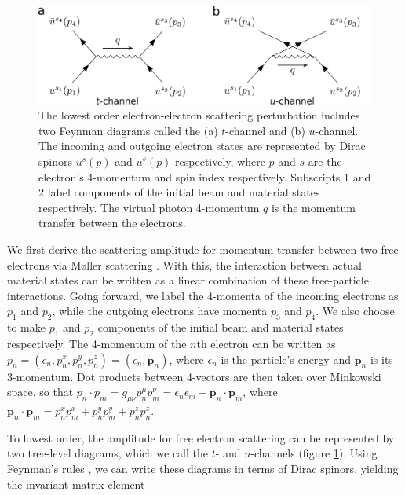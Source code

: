 \documentclass{article}
\begin{document}
\begin{figure}
  \centering
  \includegraphics[width=.9\textwidth]{fig2.pdf}
  \caption{
    The lowest order electron-electron scattering perturbation includes two
    Feynman diagrams called the (a) $t$-channel and (b) $u$-channel.
    The incoming and outgoing electron states are represented by Dirac spinors
    $u^s(p)$ and $\bar{u}^s(p)$ respectively, where $p$ and $s$ are the electron's
    4-momentum and spin index respectively.
    Subscripts 1 and 2 label components of the initial beam and material states
    respectively.
    The virtual photon 4-momentum $q$ is the momentum transfer between the
    electrons.
  }
\label{fig:tu}
\end{figure}

We first derive the scattering amplitude for momentum transfer between two free
electrons via M{\o}ller scattering \cite{Moller1932, Kragh1992, Roqu1992}.
With this, the interaction between actual material states can be written as a
linear combination of these free-particle interactions.
Going forward, we label the 4-momenta of the incoming electrons as $p_1$ and
$p_2$, while the outgoing electrons have momenta $p_3$ and $p_4$.
We also choose to make $p_1$ and $p_2$ components of the initial beam and
material states respectively.
The 4-momentum of the $n$th electron can be written as
$p_n = (\epsilon_n, p_n^x, p_n^y, p_n^z) = (\epsilon_n, \mathbf{p}_n)$,
where $\epsilon_n$ is the particle's energy and $\mathbf{p}_n$ is its
3-momentum.
Dot products between 4-vectors are then taken over Minkowski space, so that
$p_n\cdot p_m
=
g_{\mu\nu}p_n^\mu p_m^\nu
=
\epsilon_n\epsilon_m -
\mathbf{p}_n\cdot\mathbf{p}_m$,
where
$\mathbf{p}_n\cdot\mathbf{p}_m
=
p_n^xp_m^x + p_n^yp_m^y + p_n^zp_n^z$.   

To lowest order, the amplitude for free electron scattering can be represented
by two tree-level diagrams, which we call the $t$- and $u$-channels (figure
\ref{fig:tu}).
Using Feynman's rules \cite{Peskin1995, Lancaster2014}, we can write these
diagrams in terms of Dirac spinors, yielding the invariant matrix element
\end{document}
